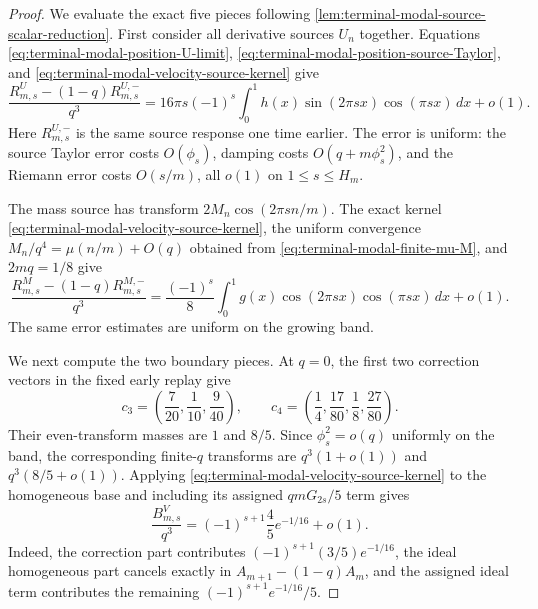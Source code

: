 \begin{proof}
We evaluate the exact five pieces following
\cref{lem:terminal-modal-source-scalar-reduction}.  First consider all
derivative sources $U_n$ together.  Equations
\eqref{eq:terminal-modal-position-U-limit},
\eqref{eq:terminal-modal-position-source-Taylor}, and
\eqref{eq:terminal-modal-velocity-source-kernel} give
\begin{equation}
 \frac{R^U_{m,s}-(1-q)R^{U,-}_{m,s}}{q^3}
 =16\pi s(-1)^s\int_0^1h(x)
 \sin(2\pi sx)\cos(\pi sx)\,dx+o(1).
 \label{eq:terminal-modal-velocity-U-limit}
\end{equation}
Here $R^{U,-}_{m,s}$ is the same source response one time earlier.  The
error is uniform: the source Taylor error costs $O(\phi_s)$, damping costs
$O(q+m\phi_s^2)$, and the Riemann error costs $O(s/m)$, all $o(1)$ on
$1\le s\le H_m$.

The mass source has transform $2M_n\cos(2\pi s n/m)$.  The exact kernel
\eqref{eq:terminal-modal-velocity-source-kernel}, the uniform convergence
$M_n/q^4=\mu(n/m)+O(q)$ obtained from
\eqref{eq:terminal-modal-finite-mu-M}, and $2mq=1/8$ give
\begin{equation}
 \frac{R^M_{m,s}-(1-q)R^{M,-}_{m,s}}{q^3}
 =\frac{(-1)^s}{8}\int_0^1g(x)
 \cos(2\pi sx)\cos(\pi sx)\,dx+o(1).
 \label{eq:terminal-modal-velocity-M-limit}
\end{equation}
The same error estimates are uniform on the growing band.

We next compute the two boundary pieces.  At $q=0$, the first two correction
vectors in the fixed early replay give
\begin{equation}
 c_3=\left(\frac7{20},\frac1{10},\frac9{40}\right),
 \qquad
 c_4=\left(\frac14,\frac{17}{80},\frac18,\frac{27}{80}\right).
 \label{eq:terminal-modal-velocity-early-corrections}
\end{equation}
Their even-transform masses are $1$ and $8/5$.  Since
$\phi_s^2=o(q)$ uniformly on the band, the corresponding finite-$q$
transforms are $q^3(1+o(1))$ and $q^3(8/5+o(1))$.  Applying
\eqref{eq:terminal-modal-velocity-source-kernel} to the homogeneous base and
including its assigned $q mG_{2s}/5$ term gives
\begin{equation}
 \frac{B^V_{m,s}}{q^3}
 =(-1)^{s+1}\frac45e^{-1/16}+o(1).
 \label{eq:terminal-modal-velocity-base-limit}
\end{equation}
Indeed, the correction part contributes
$(-1)^{s+1}(3/5)e^{-1/16}$, the ideal homogeneous part cancels exactly in
$A_{m+1}-(1-q)A_m$, and the assigned ideal term contributes the remaining
$(-1)^{s+1}e^{-1/16}/5$.


\end{proof}
